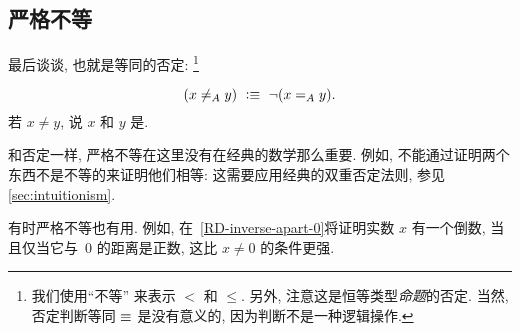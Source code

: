\subsection{严格不等}
\label{sec:disequality}

最后谈谈,
%
也就是等同的否定:
\footnote{我们使用``不等''%
来表示 $<$ 和 $\leq$. 另外, 注意这是恒等类型\emph{命题}的否定.
当然,否定判断等同 $\jdeq$ 是没有意义的, 因为判断不是一种逻辑操作.} %

\begin{equation*}
(x \neq_A y)
    \ \defeq\ \lnot (\id[A]{x}{y}).
\end{equation*}
若 $x\neq y$, 说 $x$ 和 $y$ 是.%

和否定一样, 严格不等在这里没有在经典的数学那么重要.
例如, 不能通过证明两个东西不是不等的来证明他们相等: 这需要应用经典的双重否定法则, 参见 \cref{sec:intuitionism}.

有时严格不等也有用.
例如, 在~\cref{RD-inverse-apart-0}将证明实数 $x$ 有一个倒数, 当且仅当它与~$0$ 的距离是正数, 这比 $x \neq 0$ 的条件更强.

%